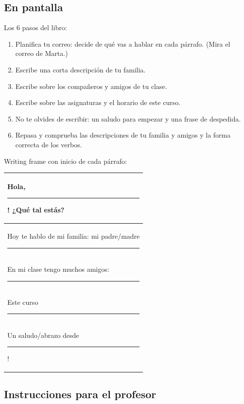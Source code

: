 \documentclass[a4paper,11pt]{article}
\begin{document}
\vspace{0.5cm}

\subsection*{En pantalla}

Los 6 pasos del libro:

\begin{enumerate}[leftmargin=1.5cm, itemsep=4pt]
\item Planifica tu correo: decide de qué vas a hablar en cada párrafo. (Mira el correo de Marta.)
\item Escribe una corta descripción de tu familia.
\item Escribe sobre los compañeros y amigos de tu clase.
\item Escribe sobre las asignaturas y el horario de este curso.
\item No te olvides de escribir: un saludo para empezar y una frase de despedida.
\item Repasa y comprueba las descripciones de tu familia y amigos y la forma correcta de los verbos.
\end{enumerate}

\vspace{0.3cm}

Writing frame con inicio de cada párrafo:

\begin{center}
\renewcommand{\arraystretch}{2}
\begin{tabular}{|>{\raggedright\arraybackslash}p{13cm}|}
\hline
\rowcolor{azulg!10}
Hola, \rule{4cm}{0.4pt}! ¿Qué tal estás? \\
\hline
Hoy te hablo de mi familia: mi padre/madre \rule{6cm}{0.4pt} \\
\hline
En mi clase tengo muchos amigos: \rule{6cm}{0.4pt} \\
\hline
Este curso \rule{8cm}{0.4pt} \\
\hline
\rowcolor{azulg!10}
Un saludo/abrazo desde \rule{4cm}{0.4pt}! \\
\hline
\end{tabular}
\end{center}

\vspace{0.5cm}

\subsection*{Instrucciones para el profesor}
\end{document}
